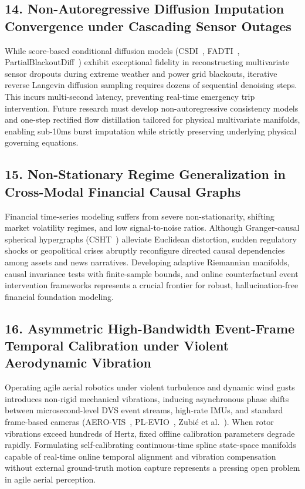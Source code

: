\subsection{14. Non-Autoregressive Diffusion Imputation Convergence under Cascading Sensor Outages}
While score-based conditional diffusion models (CSDI~\cite{Tashiro2021CSDI}, FADTI~\cite{Li2025FADTI}, PartialBlackoutDiff~\cite{Islam2025PartialBlackout}) exhibit exceptional fidelity in reconstructing multivariate sensor dropouts during extreme weather and power grid blackouts, iterative reverse Langevin diffusion sampling requires dozens of sequential denoising steps. This incurs multi-second latency, preventing real-time emergency trip intervention. Future research must develop non-autoregressive consistency models and one-step rectified flow distillation tailored for physical multivariate manifolds, enabling sub-10ms burst imputation while strictly preserving underlying physical governing equations.

\subsection{15. Non-Stationary Regime Generalization in Cross-Modal Financial Causal Graphs}
Financial time-series modeling suffers from severe non-stationarity, shifting market volatility regimes, and low signal-to-noise ratios. Although Granger-causal spherical hypergraphs (CSHT~\cite{Harit2025CSHT}) alleviate Euclidean distortion, sudden regulatory shocks or geopolitical crises abruptly reconfigure directed causal dependencies among assets and news narratives. Developing adaptive Riemannian manifolds, causal invariance tests with finite-sample bounds, and online counterfactual event intervention frameworks represents a crucial frontier for robust, hallucination-free financial foundation modeling.

\subsection{16. Asymmetric High-Bandwidth Event-Frame Temporal Calibration under Violent Aerodynamic Vibration}
Operating agile aerial robotics under violent turbulence and dynamic wind gusts introduces non-rigid mechanical vibrations, inducing asynchronous phase shifts between microsecond-level DVS event streams, high-rate IMUs, and standard frame-based cameras (AERO-VIS~\cite{Burkhardt2026AEROVIS}, PL-EVIO~\cite{Guan2022PLEVIO}, Zubi\'c et al.~\cite{Zubic2024SSM}). When rotor vibrations exceed hundreds of Hertz, fixed offline calibration parameters degrade rapidly. Formulating self-calibrating continuous-time spline state-space manifolds capable of real-time online temporal alignment and vibration compensation without external ground-truth motion capture represents a pressing open problem in agile aerial perception.

